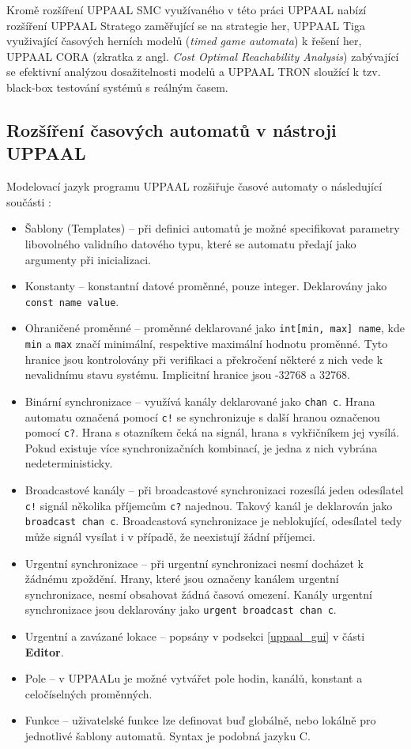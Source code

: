 Kromě rozšíření UPPAAL SMC využívaného v této práci UPPAAL nabízí rozšíření UPPAAL Stratego zaměřující se na strategie her, UPPAAL Tiga využivající časových herních modelů (\textit{timed game automata}) k řešení her, UPPAAL CORA (zkratka z angl. \textit{Cost Optimal Reachability Analysis}) zabývající se efektivní analýzou dosažitelnosti modelů a UPPAAL TRON sloužící k tzv. black-box testování systémů s reálným časem.

\subsection{Rozšíření časových automatů v nástroji UPPAAL}
Modelovací jazyk programu UPPAAL rozšiřuje časové automaty o následující součásti \cite{uppaal_intro}:

\begin{itemize}
    \item Šablony (Templates) -- při definici automatů je možné specifikovat parametry libovolného validního datového typu, které se automatu předají jako argumenty při inicializaci.
    \item Konstanty -- konstantní datové proměnné, pouze integer. Deklarovány jako \texttt{const name value}.
    \item Ohraničené proměnné -- proměnné deklarované jako \texttt{int[min, max] name}, kde \texttt{min} a \texttt{max} značí minimální, respektive maximální hodnotu proměnné. Tyto hranice jsou kontrolovány při verifikaci a překročení některé z nich vede k nevalidnímu stavu systému. Implicitní hranice jsou -32768 a 32768.
    \item Binární synchronizace -- využívá kanály deklarované jako \texttt{chan c}. Hrana automatu označená pomocí \texttt{c!} se synchronizuje s další hranou označenou pomocí \texttt{c?}. Hrana s otazníkem čeká na signál, hrana s vykřičníkem jej vysílá. Pokud existuje více synchronizačních kombinací, je jedna z nich vybrána nedeterministicky.
    \item Broadcastové kanály -- při broadcastové synchronizaci rozesílá jeden odesílatel \texttt{c!} signál několika příjemcům \texttt{c?} najednou. Takový kanál je deklarován jako \texttt{broadcast chan c}. Broadcastová synchronizace je neblokující, odesílatel tedy může signál vysílat i v případě, že neexistují žádní příjemci.
    \item Urgentní synchronizace -- při urgentní synchronizaci nesmí docházet k žádnému zpoždění. Hrany, které jsou označeny kanálem urgentní synchronizace, nesmí obsahovat žádná časová omezení. Kanály urgentní synchronizace jsou deklarovány jako \texttt{urgent broadcast chan c}.
    \item Urgentní a zavázané lokace -- popsány v podsekci \ref{uppaal_gui} v části \textbf{Editor}.
    \item Pole -- v UPPAALu je možné vytvářet pole hodin, kanálů, konstant a celočíselných proměnných.
    \item Funkce -- uživatelské funkce lze definovat buď globálně, nebo lokálně pro jednotlivé šablony automatů. Syntax je podobná jazyku C.
\end{itemize}

